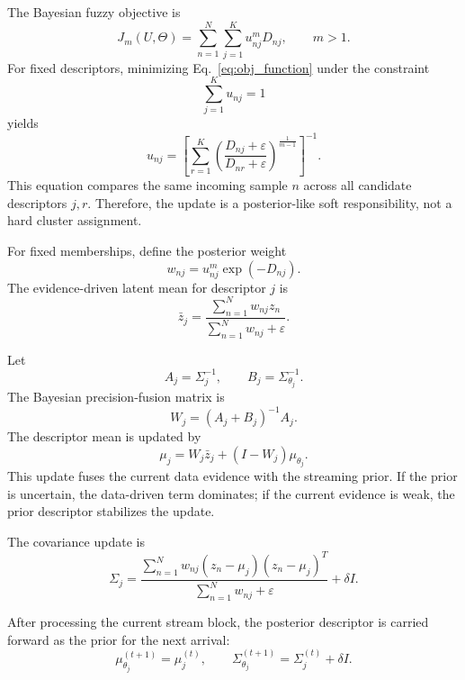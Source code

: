 \documentclass{article}
\theoremstyle{plain}
\theoremstyle{definition}
\theoremstyle{remark}
\begin{document}
The Bayesian fuzzy objective is
\begin{equation}
	\label{eq:obj_function}
	J_m(U,\Theta)
	=
	\sum_{n=1}^{N}
	\sum_{j=1}^{K}
	u_{nj}^{m}D_{nj},
	\qquad
	m>1.
\end{equation}
For fixed descriptors, minimizing Eq.~\eqref{eq:obj_function} under the constraint
\[
\sum_{j=1}^{K}u_{nj}=1
\]
yields
\begin{equation}
	\label{eq:update_u}
	u_{nj}
	=
	\left[
	\sum_{r=1}^{K}
	\left(
	\frac{D_{nj}+\varepsilon}
	{D_{nr}+\varepsilon}
	\right)^{\frac{1}{m-1}}
	\right]^{-1}.
\end{equation}
This equation compares the same incoming sample \(n\) across all candidate descriptors \(j,r\). Therefore, the update is a posterior-like soft responsibility, not a hard cluster assignment.

For fixed memberships, define the posterior weight
\begin{equation}
	\label{eq:posterior_weight}
	w_{nj}
	=
	u_{nj}^{m}\exp(-D_{nj}).
\end{equation}
The evidence-driven latent mean for descriptor \(j\) is
\begin{equation}
	\label{eq:evidence_mean}
	\bar z_j
	=
	\frac{
		\sum_{n=1}^{N}w_{nj}z_n
	}{
		\sum_{n=1}^{N}w_{nj}+\varepsilon
	}.
\end{equation}

Let
\[
A_j=\Sigma_j^{-1},
\qquad
B_j=\Sigma_{\theta_j}^{-1}.
\]
The Bayesian precision-fusion matrix is
\begin{equation}
	\label{eq:fusion_matrix}
	W_j
	=
	(A_j+B_j)^{-1}A_j.
\end{equation}
The descriptor mean is updated by
\begin{equation}
	\label{eq:update_mean}
	\mu_j
	=
	W_j\bar z_j
	+
	(I-W_j)\mu_{\theta_j}.
\end{equation}
This update fuses the current data evidence with the streaming prior. If the prior is uncertain, the data-driven term dominates; if the current evidence is weak, the prior descriptor stabilizes the update.

The covariance update is
\begin{equation}
	\label{eq:update_cov}
	\Sigma_j
	=
	\frac{
		\sum_{n=1}^{N}
		w_{nj}
		(z_n-\mu_j)(z_n-\mu_j)^T
	}{
		\sum_{n=1}^{N}w_{nj}+\varepsilon
	}
	+
	\delta I.
\end{equation}

After processing the current stream block, the posterior descriptor is carried forward as the prior for the next arrival:
\begin{equation}
	\label{eq:update_prior}
	\mu_{\theta_j}^{(t+1)}
	=
	\mu_j^{(t)},
	\qquad
	\Sigma_{\theta_j}^{(t+1)}
	=
	\Sigma_j^{(t)}+\delta I.
\end{equation}
\end{document}
